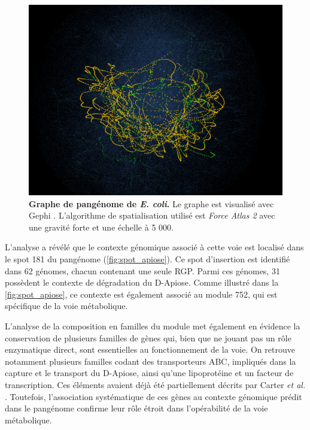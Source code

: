 \begin{figure}[htbp] 
    \centering
    \includegraphics[width=.9\textwidth]{images/pangenome_ecoli.png}
    \caption[Graphe de pangénome de \textit{E. coli}]{\textbf{Graphe de pangénome de \textit{E. coli}.} Le graphe est visualisé avec Gephi \cite{bastian_gephi_2009}. L'algorithme de spatialisation utilisé est \textit{Force Atlas 2} avec une gravité forte et une échelle à 5 000.} 
    \label{fig:pangenomeColi}
\end{figure}


L’analyse a révélé que le contexte génomique associé à cette voie est localisé dans le spot 181 du pangénome (\autoref{fig:spot_apiose}). Ce spot d’insertion est identifié dans 62 génomes, chacun contenant une seule RGP. Parmi ces génomes, 31 possèdent le contexte de dégradation du D-Apiose. Comme illustré dans la \autoref{fig:spot_apiose}, ce contexte est également associé au module 752, qui est spécifique de la voie métabolique.

L’analyse de la composition en familles du module met également en évidence la conservation de plusieurs familles de gènes qui, bien que ne jouant pas un rôle enzymatique direct, sont essentielles au fonctionnement de la voie. On retrouve notamment plusieurs familles codant des transporteurs ABC, impliqués dans la capture et le transport du D-Apiose, ainsi qu’une lipoprotéine et un facteur de transcription. Ces éléments avaient déjà été partiellement décrits par Carter \textit{et al.} \cite{carter_functional_2018}. Toutefois, l’association systématique de ces gènes au contexte génomique prédit dans le pangénome confirme leur rôle étroit dans l’opérabilité de la voie métabolique.

